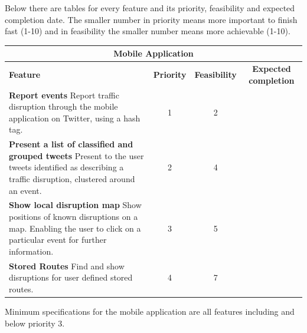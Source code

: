 Below there are tables for every feature and its priority, feasibility and expected completion date. The smaller number in priority means more important to finish fast (1-10) and in feasibility the smaller number means more achievable (1-10).

\begin{center}
\begin{tabular}{ | p{6cm} | c | c | c | }
\hline
\multicolumn{4}{|c|}{\textbf{Mobile Application}} \\ \hline
\textbf{Feature} & \textbf{Priority} & \textbf{Feasibility} & \textbf{Expected completion} \\ \hline
\textbf{Report events}\newline
Report traffic disruption through the mobile application on Twitter, using a hash tag. & 1 & 2 & \\ \hline
\textbf{Present a list of classified and grouped tweets}\newline
Present to the user tweets identified as describing a traffic disruption,
clustered around an event. & 2 & 4 & \\ \hline
\textbf{Show local disruption map}\newline
Show positions of known disruptions on a map. Enabling the user to click on a
particular event for further information. & 3 & 5 & \\ \hline
\textbf{Stored Routes}\newline
Find and show disruptions for user defined stored routes. & 4 & 7 & \\ \hline
\end{tabular}
\end{center}
Minimum specifications for the mobile application are all features including
and below priority 3.
